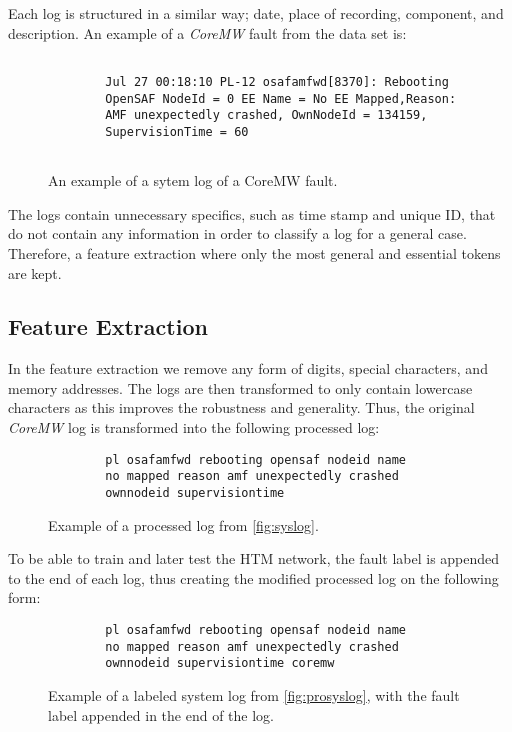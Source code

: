 Each log is structured in a similar way; date, place of recording, component, and description. An example of a \textit{CoreMW} fault from the data set is:

\begin{figure}[H]
    \centering
        \begin{verbatim}
         
        Jul 27 00:18:10 PL-12 osafamfwd[8370]: Rebooting 
        OpenSAF NodeId = 0 EE Name = No EE Mapped,Reason:
        AMF unexpectedly crashed, OwnNodeId = 134159, 
        SupervisionTime = 60
    
        \end{verbatim}
    \caption{An example of a sytem log of a CoreMW fault.}
    \label{fig:syslog}
\end{figure}



The logs contain unnecessary specifics, such as time stamp and unique ID, that do not contain any information in order to classify a log for a general case. Therefore, a feature extraction where only the most general and essential tokens are kept.


\subsection{Feature Extraction}
In the feature extraction we remove any form of digits, special characters, and memory addresses. The logs are then transformed to only contain lowercase characters as this improves the robustness and generality. Thus, the original \textit{CoreMW} log is transformed into the following processed log:


\begin{figure}[H]
    \centering
    \begin{verbatim}
        pl osafamfwd rebooting opensaf nodeid name 
        no mapped reason amf unexpectedly crashed
        ownnodeid supervisiontime
    \end{verbatim}
    \caption{Example of a processed log from \autoref{fig:syslog}.}
    \label{fig:prosyslog}
\end{figure}


To be able to train and later test the HTM network, the fault label is appended to the end of each log, thus creating the modified processed log on the following form:


\begin{figure}[H]
    \centering
    \begin{verbatim}
        pl osafamfwd rebooting opensaf nodeid name
        no mapped reason amf unexpectedly crashed 
        ownnodeid supervisiontime coremw
    \end{verbatim}
    \caption{Example of a labeled system log from \autoref{fig:prosyslog}, with the fault label appended in the end of the log.}
    \label{fig:labelsyslog}
\end{figure}


